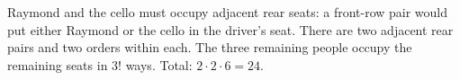 Raymond and the cello must occupy adjacent rear seats: a front-row pair would put either Raymond or the cello in the driver's seat. There are two adjacent rear pairs and two orders within each. The three remaining people occupy the remaining seats in $3!$ ways. Total: $2\cdot2\cdot6=\boxed{24}$.
